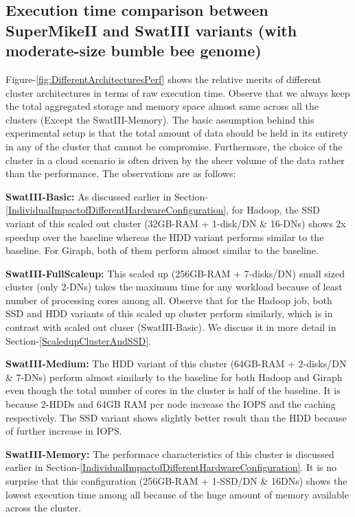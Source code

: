 \documentclass[conference]{IEEEtran}
\begin{document}
\subsection {Execution time comparison between SuperMikeII and SwatIII variants (with moderate-size bumble bee genome)} \label{ExecutionTimeDiffArchBumblebee}
Figure-\ref{fig:DifferentArchitecturesPerf} shows the relative merits of different cluster architectures in terms of raw execution time. Observe that we always keep the total aggregated storage and memory space almost same across all the clusters (Except the SwatIII-Memory). The basic assumption behind this experimental setup is that the total amount of data should be held in its entirety in any of the cluster that cannot be compromise. Furthermore, the choice of the cluster in a cloud scenario is often driven by the sheer volume of the data rather than the performance. The observations are as follows:
\begin{inparaenum}[\itshape 1\upshape)]
\item \textbf{SwatIII-Basic:} As discussed earlier in Section-\ref{IndividualImpactofDifferentHardwareConfiguration}, for Hadoop, the SSD variant of this scaled out cluster (32GB-RAM + 1-disk/DN \& 16-DNs) shows $2$x speedup over the baseline whereas the HDD variant performs similar to the baseline. For Giraph, both of them perform almost similar to the baseline.
\item \textbf{SwatIII-FullScaleup:} This scaled up (256GB-RAM + 7-disks/DN) small sized cluster (only 2-DNs) takes the maximum time for any workload because of least number of processing cores among all. Observe that for the Hadoop job, both SSD and HDD variants of this scaled up cluster perform similarly, which is in contrast with scaled out cluser (SwatIII-Basic). We discuss it in more detail in Section-\ref{ScaledupClusterAndSSD}.
\item \textbf{SwatIII-Medium:} The HDD variant of this cluster (64GB-RAM + 2-disks/DN \& 7-DNs) perform almost similarly to the baseline for both Hadoop and Giraph even though the total number of cores in the cluster is half of the baseline. It is because 2-HDDs and 64GB RAM per node increase the IOPS and the caching respectively. The SSD variant shows slightly better result than the HDD because of further increase in IOPS.
\item \textbf{SwatIII-Memory:} The performace characteristics of this cluster is discussed earlier in Section-\ref{IndividualImpactofDifferentHardwareConfiguration}. 
It is no surprise that this configuration (256GB-RAM + 1-SSD/DN \& 16DNs) shows the lowest execution time among all because of the huge amount of memory available across the cluster.
\end{inparaenum}
\end{document}
